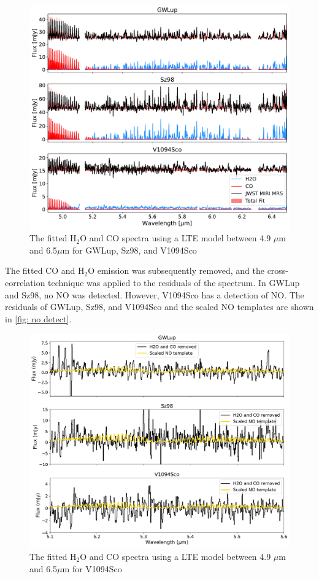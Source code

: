 \documentclass[oneside, single, authoryear, semicolon, 12pt]{lion-msc}
\newcommand{\4}{$_4$}
\newcommand{\3}{$_3$}
\newcommand{\2}{$_2$}
\begin{document}
\begin{figure}[H]
    \centering
    \includegraphics[width=\linewidth]{Figures/Fits.pdf}
    \caption{The fitted H\2O and CO spectra using a LTE model between 4.9 $\mu$m and 6.5$\mu$m for GWLup, Sz98, and V1094Sco}
    \label{fig: fits}
\end{figure}

The fitted CO and H\2O emission was subsequently removed, and the cross-correlation technique was applied to the residuals of the spectrum. In GWLup and Sz98, no NO was detected. However, V1094Sco has a detection of NO. The residuals of GWLup, Sz98, and V1094Sco and the scaled NO templates are shown in \autoref{fig: no detect}. 
\begin{figure}[H]
    \centering
    \includegraphics[width=\linewidth]{Figures/NO_Detect_stacked.pdf}
    \caption{The fitted H\2O and CO spectra using a LTE model between 4.9 $\mu$m and 6.5$\mu$m for V1094Sco}
    \label{fig: no detect}
\end{figure}
\end{document}
